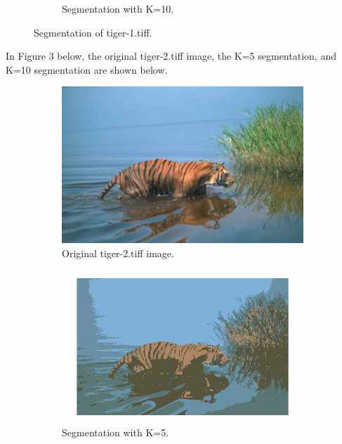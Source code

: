 \documentclass[12pt]{report}
\begin{document}
\begin{enumerate}
\begin{figure}[H]
\begin{subfigure}{0.55\linewidth}
      \caption{Segmentation with K=10.}
    \end{subfigure}
    \caption{Segmentation of tiger-1.tiff.}
  \end{figure}

  \newpage
  In Figure 3 below, the original tiger-2.tiff image, the K=5 segmentation, and
  K=10 segmentation are shown below.

  \begin{figure}[H]
    \centering
    \begin{subfigure}{0.48\linewidth}
      \includegraphics[width=\linewidth]{tiger-2.png}
      \caption{Original tiger-2.tiff image.}
    \end{subfigure}
    \begin{subfigure}{0.55\linewidth}
      \includegraphics[width=\linewidth]{3a5.png}
      \caption{Segmentation with K=5.}
    \end{subfigure}
    \begin{subfigure}{0.55\linewidth}

\end{subfigure}
\end{figure}
\end{enumerate}
\end{document}
